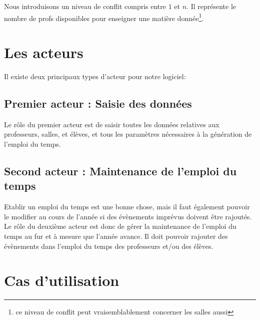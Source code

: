 \documentclass[12pt,a4paper,french]{article}
\begin{document}
Nous introduisons un niveau de conflit compris entre $1$ et $n$. Il représente le nombre de profs disponibles pour enseigner une matière donnée\footnote{ce niveau de conflit peut vraisemblablement concerner les salles aussi}.

\newpage
\section{Les acteurs}        
Il existe deux principaux types d'acteur pour notre logiciel:

\subsection{Premier acteur : Saisie des données}
Le rôle du premier acteur est de saisir toutes les données relatives aux professeurs, salles, et élèves, et tous les paramètres nécessaires à la génération de l'emploi du temps.
        
\subsection{Second acteur : Maintenance de l'emploi du temps}
Etablir un emploi du temps est une bonne chose, mais il faut  également pouvoir le modifier au cours de l'année si des évènements imprévus doivent être rajoutés.
Le rôle du deuxième acteur est donc de gérer la maintenance de l'emploi du temps au fur et à mesure que l'année avance. Il doit pouvoir rajouter des évènements dans l'emploi du temps des professeurs et/ou des élèves.


\newpage
\section{Cas d'utilisation}
\end{document}
